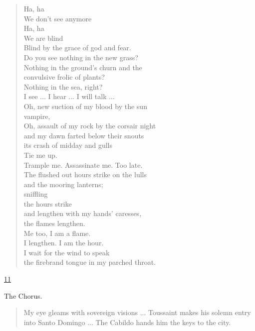 \documentclass[letterpaper,article,12pt,oneside,notitlepage]{memoir}
\begin{document}
\begin{verse}
Ha, ha \\
We don't see anymore \\
Ha, ha \\
We are blind \\
Blind by the grace of god and fear. \\
Do you see nothing in the new grass? \\
Nothing in the ground's churn and the \\
convulsive frolic of plants? \\
Nothing in the sea, right? \\
I see ... I hear ... I will talk ... \\
Oh, new suction of my blood by the sun \\
vampire, \\
Oh, assault of my rock by the corsair night \\
and my dawn farted below their snouts \\
its crash of midday and gulls \\
Tie me up. \\
Trample me. Assassinate me. Too late. \\
The flushed out hours strike on the lulls \\
and the mooring lanterns; \\
sniffling \\
the hours strike \\
and lengthen with my hands' caresses, \\
the flames lengthen. \\
Me too, I am a flame. \\
I lengthen. I am the hour. \\
I wait for the wind to speak \\
the firebrand tongue in my parched throat. \\
\end{verse}

\clearpage

\href{http://cesaire.elotroalex.com/chiens/chiens/p011.html}{11}

\begin{center}The Chorus.\end{center}

\begin{verse}
\indent My eye gleams with sovereign visions ... Toussaint makes his solemn entry into Santo Domingo ... The Cabildo hands him the keys to the city. \\
\end{verse}
\end{document}

